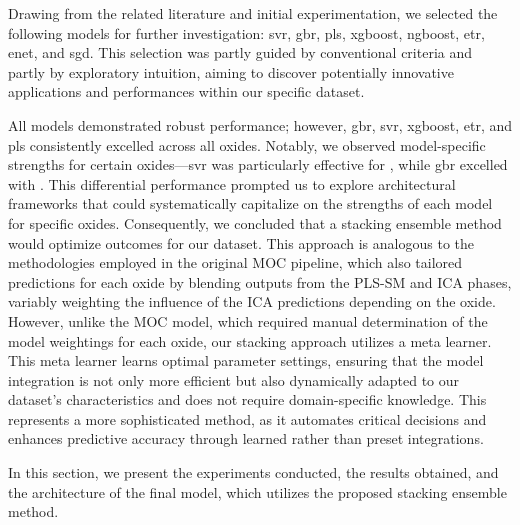 Drawing from the related literature and initial experimentation, we selected the following models for further investigation: \gls{svr}, \gls{gbr}, \gls{pls}, \gls{xgboost}, \gls{ngboost}, \gls{etr}, \gls{enet}, and \gls{sgd}.
This selection was partly guided by conventional criteria and partly by exploratory intuition, aiming to discover potentially innovative applications and performances within our specific dataset.

All models demonstrated robust performance; however, \gls{gbr}, \gls{svr}, \gls{xgboost}, \gls{etr}, and \gls{pls} consistently excelled across all oxides.
Notably, we observed model-specific strengths for certain oxides—\gls{svr} was particularly effective for , while \gls{gbr} excelled with .
This differential performance prompted us to explore architectural frameworks that could systematically capitalize on the strengths of each model for specific oxides.
Consequently, we concluded that a stacking ensemble method would optimize outcomes for our dataset.
This approach is analogous to the methodologies employed in the original MOC pipeline, which also tailored predictions for each oxide by blending outputs from the PLS-SM and ICA phases, variably weighting the influence of the ICA predictions depending on the oxide.
However, unlike the MOC model, which required manual determination of the model weightings for each oxide, our stacking approach utilizes a meta learner.
This meta learner learns optimal parameter settings, ensuring that the model integration is not only more efficient but also dynamically adapted to our dataset's characteristics and does not require domain-specific knowledge.
This represents a more sophisticated method, as it automates critical decisions and enhances predictive accuracy through learned rather than preset integrations.

In this section, we present the experiments conducted, the results obtained, and the architecture of the final model, which utilizes the proposed stacking ensemble method.
